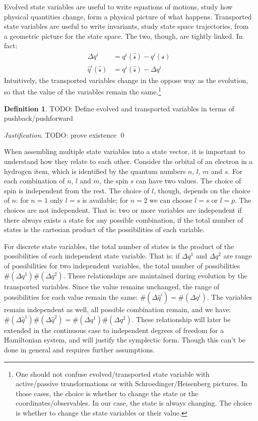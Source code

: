 \documentclass[aps,pra,10pt,twocolumn,floatfix,nofootinbib]{revtex4-1}
\theoremstyle{definition}
\newtheorem{defn}[prop]{Definition}
\newenvironment{justification}{\emph{Justification}.}{\qed}
\begin{document}
Evolved state variables are useful to write equations of motions, study how physical quantities change, form a physical picture of what happens. Transported state variables are useful to write invariants, study state space trajectories, from a geometric picture for the state space. The two, though, are tightly linked. In fact:
\begin{align*}
\Delta q^i &= q^i(\hat{\mathcal{s}}) - q^i(\mathcal{s}) \\
\hat{q}^i(\hat{\mathcal{s}}) &= q^i(\hat{\mathcal{s}}) - \Delta q^i
\end{align*}
Intuitively, the transported variables change in the oppose way as the evolution, so that the value of the variables remain the same.\footnote{One should not confuse evolved/transported state variable with active/passive transformations or with Schroedinger/Heisenberg pictures. In those cases, the choice is whether to change the state or the coordinates/observables. In our case, the state is always changing. The choice is whether to change the state variables or their value.}

\begin{defn}\label{evolved_transported_variable}
TODO: Define evolved and transported variables in terms of pushback/pushforward
\end{defn}

\begin{justification}
TODO: prove existence
\end{justification}

When assembling multiple state variables into a state vector, it is important to understand how they relate to each other. Consider the orbital of an electron in a hydrogen item, which is identified by the quantum numbers $n$, $l$, $m$ and $s$. For each combination of $n$, $l$ and $m$, the spin $s$ can have two values. The choice of spin is independent from the rest. The choice of $l$, though, depends on the choice of $n$: for $n=1$ only $l=s$ is available; for $n=2$ we can choose $l=s$ or $l=p$. The choices are not independent. That is: two or more variables are independent if there always exists a state for any possible combination, if the total number of states is the cartesian product of the possibilities of each variable.

For discrete state variables, the total number of states is the product of the possibilities of each independent state variable. That is: if $\Delta q^1$ and $\Delta q^2$ are range of possibilities for two independent variables, the total number of possibilities $\#(\Delta q^1) \#(\Delta q^2)$. These relationships are maintained during evolution by the transported variables. Since the value remains unchanged, the range of possibilities for each value remain the same: $\#(\Delta \hat{q}^i) = \#(\Delta q^i)$. The variables remain independent as well, all possible combination remain, and we have: $\#(\Delta \hat{q}^1) \#(\Delta \hat{q}^2) = \#(\Delta q^1) \#(\Delta q^2)$. These relationship will later be extended in the continuous case to independent degrees of freedom for a Hamiltonian system, and will justify the symplectic form. Though this can't be done in general and requires further assumptions.
\end{document}

